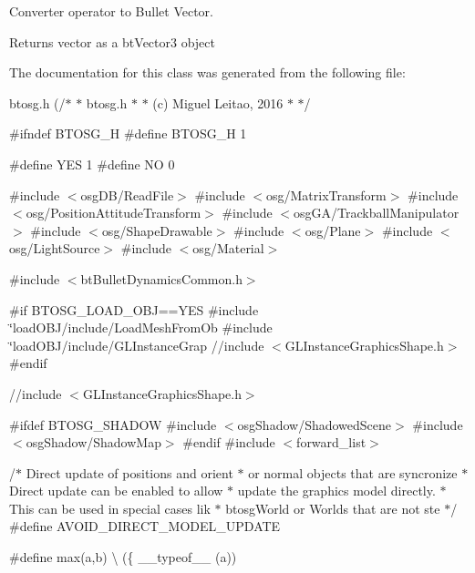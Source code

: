Converter operator to Bullet Vector. 

Returns vector as a bt\+Vector3 object 

The documentation for this class was generated from the following file\+:\begin{DoxyCompactItemize}
\item 
btosg.\+h (/$\ast$
 $\ast$	btosg.\+h
 $\ast$
 $\ast$	(c) Miguel Leitao, 2016
 $\ast$
 $\ast$/

\#ifndef B\+T\+O\+S\+G\+\_\+\+H
\#define B\+T\+O\+S\+G\+\_\+\+H 1

\#define Y\+E\+S 1
\#define N\+O  0

\#include $<$osg\+D\+B/\+Read\+File$>$
\#include $<$osg/\+Matrix\+Transform$>$
\#include $<$osg/\+Position\+Attitude\+Transform$>$
\#include $<$osg\+G\+A/\+Trackball\+Manipulator$>$
\#include $<$osg/\+Shape\+Drawable$>$
\#include $<$osg/\+Plane$>$
\#include $<$osg/\+Light\+Source$>$
\#include $<$osg/\+Material$>$

\#include $<$bt\+Bullet\+Dynamics\+Common.\+h$>$

\#if B\+T\+O\+S\+G\+\_\+\+L\+O\+A\+D\+\_\+\+O\+B\+J==\+Y\+E\+S
\#include \char`\"{}load\+O\+B\+J/include/\+Load\+Mesh\+From\+Ob
\#include \char`\"{}load\+O\+B\+J/include/\+G\+L\+Instance\+Grap
//include $<$\+G\+L\+Instance\+Graphics\+Shape.\+h$>$
\#endif

//include $<$\+G\+L\+Instance\+Graphics\+Shape.\+h$>$

\#ifdef B\+T\+O\+S\+G\+\_\+\+S\+H\+A\+D\+O\+W
\#include $<$osg\+Shadow/\+Shadowed\+Scene$>$
\#include $<$osg\+Shadow/\+Shadow\+Map$>$
\#endif
\#include $<$forward\+\_\+list$>$

/$\ast$ Direct update of positions and orient
 $\ast$ or normal objects that are syncronize
 $\ast$ Direct update can be enabled to allow
 $\ast$ update the graphics model directly.
 $\ast$ This can be used in special cases lik
 $\ast$ btosg\+World or Worlds that are not ste
 $\ast$/
\#define A\+V\+O\+I\+D\+\_\+\+D\+I\+R\+E\+C\+T\+\_\+\+M\+O\+D\+E\+L\+\_\+\+U\+P\+D\+A\+T\+E

\#define max(a,b) \textbackslash{}
   (\{ \+\_\+\+\_\+typeof\+\_\+\+\_\+ (a))\end{DoxyCompactItemize}
